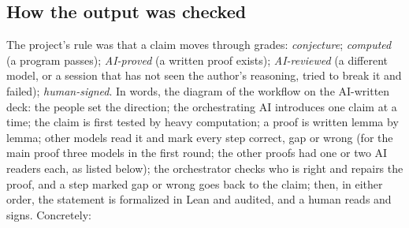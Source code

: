 \documentclass[11pt]{article}
\theoremstyle{definition}
\theoremstyle{remark}
\numberwithin{equation}{section}
\numberwithin{figure}{section}
\begin{document}
\subsection{How the output was checked}
The project's rule was that a claim moves through grades: \emph{conjecture}; \emph{computed} (a program
passes); \emph{AI-proved} (a written proof exists); \emph{AI-reviewed} (a different model, or a session that
has not seen the author's reasoning, tried to break it and failed); \emph{human-signed}. In words, the
diagram of the workflow on the AI-written deck: the people set the direction; the orchestrating AI introduces one claim at a time;
the claim is first tested by heavy computation; a proof is written lemma by lemma; other models read it and
mark every step correct, gap or wrong (for the main proof three models in the first round; the other proofs
had one or two AI readers each, as listed below); the orchestrator checks who is right and repairs the proof, and
a step marked gap or wrong goes back to the claim; then, in either order, the statement is formalized in Lean
and audited, and a human reads and signs. Concretely:
\end{document}
